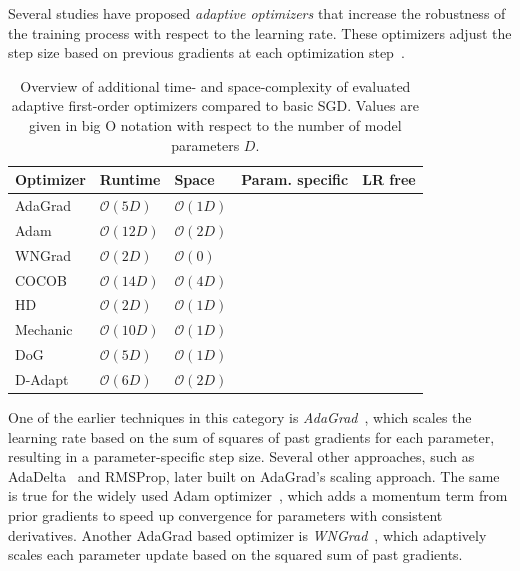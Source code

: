 \documentclass{article} %
\newcommand{\cmark}{\ding{51}} %
\newcommand{\xmark}{\ding{55}} %
\begin{document}
Several studies have proposed \textit{adaptive optimizers} that increase the robustness of the training process with respect to the learning rate.
These optimizers adjust the step size based on previous gradients at each optimization step~\citep{duchiAdaptiveSubgradientMethods2011}.

\begin{table}[ht]
   \centering
   \small
   \caption{
      Overview of additional time- and space-complexity of evaluated adaptive first-order optimizers compared to basic SGD.
      Values are given in big O notation with respect to the number of model parameters $D$.
   }\label{tab:param_free_optims}
   \begin{tabular}{@{}lllcc@{}}
      \toprule
      Optimizer                & Runtime            & Space             & Param. specific & LR free \\ \midrule
      AdaGrad                  & $\mathcal{O}(5D)$  & $\mathcal{O}(1D)$ & \cmark          & \xmark  \\
      Adam                     & $\mathcal{O}(12D)$ & $\mathcal{O}(2D)$ & \cmark          & \xmark  \\
      WNGrad                   & $\mathcal{O}(2D)$  & $\mathcal{O}(0)$  & \xmark          & \xmark  \\
      COCOB                    & $\mathcal{O}(14D)$ & $\mathcal{O}(4D)$ & \cmark          & \cmark  \\
      HD\footnotemark[2]       & $\mathcal{O}(2D)$  & $\mathcal{O}(1D)$ & \xmark          & \xmark  \\
      Mechanic\footnotemark[2] & $\mathcal{O}(10D)$ & $\mathcal{O}(1D)$ & \cmark          & \cmark  \\
      DoG                      & $\mathcal{O}(5D)$  & $\mathcal{O}(1D)$ & \xmark          & \cmark  \\
      D-Adapt\footnotemark[2]  & $\mathcal{O}(6D)$  & $\mathcal{O}(2D)$ & \xmark          & \cmark  \\
      \bottomrule
   \end{tabular}
\end{table}

One of the earlier techniques in this category is \textit{AdaGrad}~\citep{duchiAdaptiveSubgradientMethods2011}, which scales the learning rate based on the sum of squares of past gradients for each parameter, resulting in a parameter-specific step size.
Several other approaches, such as AdaDelta~\citep{zeilerADADELTAAdaptiveLearning2012a} and RMSProp, later built on AdaGrad's scaling approach.
The same is true for the widely used Adam optimizer~\citep{kingmaAdamMethodStochastic2017b}, which adds a momentum term from prior gradients to speed up convergence for parameters with consistent derivatives.
Another AdaGrad based optimizer is \textit{WNGrad}~\citep{wuWNGradLearnLearning2020}, which adaptively scales each parameter update based on the squared sum of past gradients.
\end{document}
